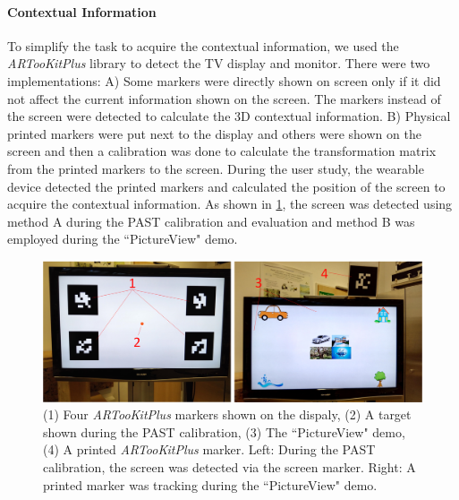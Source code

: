 \paragraph{Contextual Information} {\label{sec:3-PAST:markerDetection}}
To simplify the task to acquire the contextual information, we used the \textit{ARTooKitPlus}\cite{Wagner2007a} library to detect the TV display and monitor. There were two implementations: A) Some markers were directly shown  on screen only if it did not affect the current information shown on the screen. The markers instead of the screen were detected to calculate the 3D contextual information. B) Physical printed markers were put next to the display and others were shown on the screen and then a calibration was done to calculate the transformation matrix from the printed markers to the screen. During the user study, the wearable device detected the printed markers and calculated the position of the screen to acquire the contextual information. As shown in \figurename{ \ref{fig:3-PAST:MarkerTracking}}, the screen was detected using method A during the PAST calibration and evaluation and method B was employed during the ``PictureView" demo.
\begin{figure}[htb]
	\centering
	\includegraphics[width = \linewidth]{figures/3-PAST/display.png}
	\caption{(1) Four \textit{ARTooKitPlus} markers shown on the dispaly, (2) A target shown during the PAST calibration, (3) The ``PictureView" demo, (4) A printed \textit{ARTooKitPlus} marker. Left: During the PAST calibration, the screen was detected via the screen marker. Right: A printed marker was tracking during the ``PictureView" demo.}
	\label{fig:3-PAST:MarkerTracking}
\end{figure}
